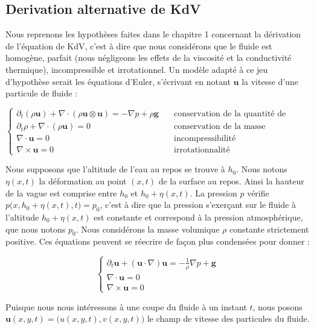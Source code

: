 \subsection{Derivation alternative de KdV}

Nous reprenons les hypothèses faites dans le chapitre 1 concernant la dérivation de l'équation de KdV, c'est à dire que nous considérons que le fluide est homogène, parfait (nous négligeons les effets de la viscosité et la conductivité thermique), incompressible et irrotationnel.
Un modèle adapté à ce jeu d'hypothèse serait les équations d'Euler, s'écrivant en notant $\textbf{u}$ la vitesse d'une particule de fluide :

$$\begin{cases}
    \partial_t (\rho \textbf{u}) + \nabla \cdot(\rho \textbf{u} \otimes \textbf{u}) = - \nabla p + \rho \textbf{g} \quad &\text{conservation de la quantité de mouvement} \\
    \partial_t\rho + \nabla \cdot (\rho \textbf{u})= 0 \quad &\text{conservation de la masse} \\
    \nabla \cdot \textbf{u} = 0 &\text{incompressibilité} \\
    \nabla \times \textbf{u} = 0 &\text{irrotationnalité} 
    
\end{cases}$$

Nous supposons que l'altitude de l'eau au repos se trouve à $h_0$. Nous notons $\eta(x,t)$ la déformation au point $(x,t)$ de la surface au repos. Ainsi la hauteur de la vague est comprise entre $h_0$ et $h_0 + \eta (x,t)$. La pression $p$ vérifie $p\big(x,h_0 + \eta(x,t),t\big) = p_0$, c'est à dire que la pression s'exerçant sur le fluide à l'altitude $h_0 + \eta(x,t)$ est constante et correspond à la pression atmosphérique, que nous notons $p_0$. Nous considérons la masse volumique $\rho$ constante strictement positive.
Ces équations peuvent se réecrire de façon plus condensées pour donner :

$$\begin{cases}
    \partial_t \textbf{u} + (\textbf{u} \cdot \nabla)\textbf{u} = - \frac{1}{\rho}\nabla p + \textbf{g} \\
    \nabla \cdot \textbf{u} = 0 \\
    \nabla \times \textbf{u} = 0
\end{cases}$$

Puisque nous nous intéressons à une coupe du fluide à un instant $t$, nous posons $\textbf{u}(x,y,t) = \big( u(x,y,t), v(x,y,t) \big)$ le champ de vitesse des particules du fluide. 

